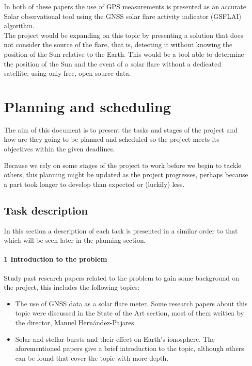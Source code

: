 In both of these papers the use of GPS measurements is presented as an accurate Solar observational tool using the GNSS solar flare activity indicator (GSFLAI) algorithm.\\

The project would be expanding on this topic by presenting a solution that does not consider the source of the flare, that is, detecting it without knowing the position of the Sun relative to the Earth. This would be a tool able to determine the position of the Sun and the event of a solar flare without a dedicated satellite, using only free, open-source data.

\newpage
\section{Planning and scheduling}

The aim of this document is to present the tasks and stages of the project and how are they going to be planned and scheduled so the project meets its objectives within the given deadlines.

Because we rely on some stages of the project to work before we begin to tackle others, this planning might be updated as the project progresses, perhaps because a part took longer to develop than expected or (luckily) less.

\subsection{Task description}

In this section a description of each task is presented in a similar order to that which will be seen later in the planning section.

\paragraph{1 Introduction to the problem}

Study past research papers related to the problem to gain some background on the project, this includes the following topics:

\begin{itemize}
  \item The use of GNSS data as a solar flare meter. Some research papers about this topic were discussed in the State of the Art section, most of them written by the director, Manuel Hernández-Pajares. \cite{hernandez2012gnss}
  \item Solar and stellar bursts and their effect on Earth’s ionosphere. The aforementioned papers give a brief introduction to the topic, although others can be found that cover the topic with more depth. \cite{mitra1974ionospheric}
\end{itemize}

